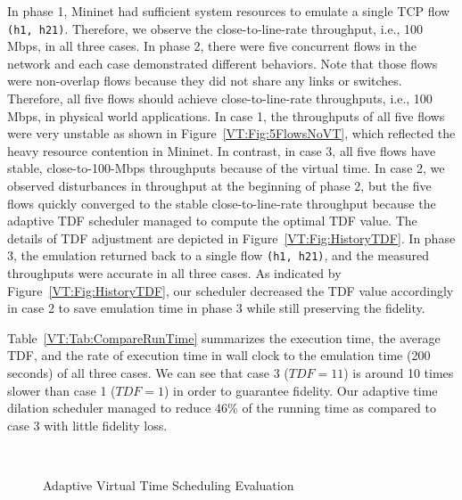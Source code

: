 In phase 1, Mininet had sufficient system resources to emulate a single TCP flow \texttt{(h1, h21)}.
Therefore, we observe the close-to-line-rate throughput, i.e., 100 Mbps, in all three cases.
In phase 2, there were five concurrent flows in the network and each case demonstrated different behaviors.
Note that those flows were non-overlap flows because they did not share any links or switches.
Therefore, all five flows should achieve close-to-line-rate throughputs, i.e., 100 Mbps, in physical world applications.
In case 1, the throughputs of all five flows were very unstable as shown in Figure~\ref{VT:Fig:5FlowsNoVT},
which reflected the heavy resource contention in Mininet.
In contrast, in case 3, all five flows have stable, close-to-100-Mbps throughputs because of the virtual time.
In case 2, we observed disturbances in throughput at the beginning of phase 2,
but the five flows quickly converged to the stable close-to-line-rate throughput because the adaptive TDF scheduler managed to compute the optimal TDF value.
The details of TDF adjustment are depicted in Figure~\ref{VT:Fig:HistoryTDF}.
In phase 3, the emulation returned back to a single flow \texttt{(h1, h21)}, and the measured throughputs were accurate in all three cases.
As indicated by Figure~\ref{VT:Fig:HistoryTDF}, our scheduler decreased the TDF value accordingly
in case 2 to save emulation time in phase 3 while still preserving the fidelity.

Table~\ref{VT:Tab:CompareRunTime} summarizes the execution time, the average TDF,
and the rate of execution time in wall clock to the emulation time (200 seconds) of all three cases. 
We can see that case 3 ($TDF = 11$) is around 10 times slower than case 1 ($TDF = 1$) in order to guarantee fidelity.
Our adaptive time dilation scheduler managed to reduce 46\% of the running time as compared to case 3 with little fidelity loss. 

\begin{figure}
    \centering
    \\
    \caption{Adaptive Virtual Time Scheduling Evaluation}
    \label{VT:Fig:Adaptive}
\end{figure}

